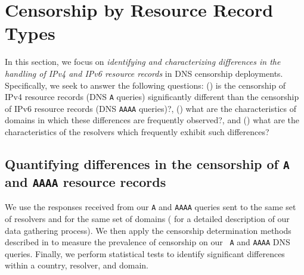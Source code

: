 \section{Censorship by Resource Record Types} \label{sec:resources}

In this section, we focus on {\it identifying and characterizing differences in
the handling of IPv4 and IPv6 resource records} in DNS censorship deployments.
Specifically, we seek to answer the following questions: 
%
() is the censorship of IPv4 resource records (DNS
{\tt A} queries) significantly different than the censorship of IPv6 resource
records (DNS {\tt AAAA} queries)?,
%
() what are the characteristics of domains in which
these differences are frequently observed?, and
%
() what are the characteristics of the resolvers
which frequently exhibit such differences?

\subsection{Quantifying differences in the censorship of \texttt{A} and
\texttt{AAAA} resource records} \label{sec:resources:sig}
%
We use the responses received from our {\tt A} and {\tt AAAA} queries sent to
the same set of resolvers and for the same set of domains (\cf
{} for a detailed description of our data gathering
process). We then apply the censorship determination methods described in
 to measure the prevalence of censorship on our {\tt
A} and {\tt AAAA} DNS queries. Finally, we perform statistical tests to
identify significant differences within a country, resolver, and domain. 

